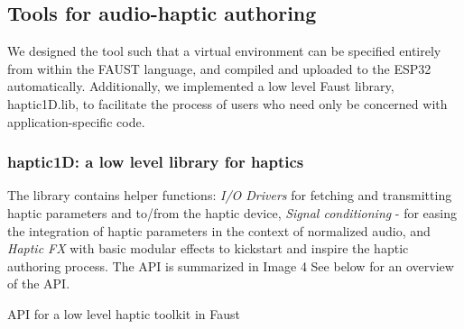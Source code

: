 \documentclass[sigconf]{nimeart}
\begin{document}
\subsection{Tools for audio-haptic authoring}\label{tools-for-audio-haptic-authoring}

We designed the tool such that a virtual environment can be specified entirely from within the FAUST language, and compiled and uploaded to the ESP32 automatically. Additionally, we implemented a low level Faust library, haptic1D.lib, to facilitate the process of users who need only be concerned with application-specific code.

\subsubsection{haptic1D: a low level library for haptics}\label{haptic1d-a-low-level-library-for-haptics}

The library contains helper functions: \emph{I/O Drivers} for fetching and transmitting haptic parameters and to/from the haptic device, \emph{Signal conditioning} - for easing the integration of haptic parameters in the context of normalized audio, and \emph{Haptic FX} with basic modular effects to kickstart and inspire the haptic authoring process. The API is summarized in Image 4 See below for an overview of the API.

API for a low level haptic toolkit in Faust
\end{document}
